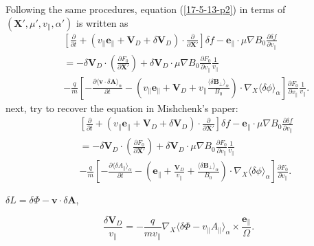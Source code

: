 \documentclass{article}
\begin{document}
Following the same procedures, equation (\ref{17-5-13-p2}) in terms of
$(\mathbf{X}', \mu', v_{\parallel}, \alpha')$ is written as
\begin{eqnarray}
  &  & \left[ \frac{\partial}{\partial t} + (v_{\parallel}
  \mathbf{e}_{\parallel} +\mathbf{V}_D + \delta \mathbf{V}_D) \cdot
  \frac{\partial}{\partial \mathbf{X}'} \right] \delta f
  -\mathbf{e}_{\parallel} \cdot \mu \nabla B_0 \frac{\partial \delta
  f}{\partial v_{\parallel}} \nonumber\\
  &  & = - \delta \mathbf{V}_D \cdot \left( \frac{\partial F_0}{\partial
  \mathbf{X}'} \right) + \delta \mathbf{V}_D \cdot \mu \nabla B_0
  \frac{\partial F_0}{\partial v_{\parallel}} \frac{1}{v_{\parallel}}
  \nonumber\\
  &  & - \frac{q}{m} \left[ - \frac{\partial \langle \mathbf{v} \cdot \delta
  \mathbf{A} \rangle_{\alpha}}{\partial t} - \left( v_{\parallel}
  \mathbf{e}_{\parallel} +\mathbf{V}_D + v_{\parallel} \frac{\langle \delta
  \mathbf{B}_{\perp} \rangle_{\alpha}}{B_0} \right) \cdot \nabla_X \langle
  \delta \phi \rangle_{\alpha} \right] \frac{\partial F_0}{\partial
  v_{\parallel}}  \frac{1}{v_{\parallel}} .  \label{17-5-13-p2m}
\end{eqnarray}
next, try to recover the equation in Mishchenk's paper:
\begin{eqnarray*}
  &  & \left[ \frac{\partial}{\partial t} + (v_{\parallel}
  \mathbf{e}_{\parallel} +\mathbf{V}_D + \delta \mathbf{V}_D) \cdot
  \frac{\partial}{\partial \mathbf{X}'} \right] \delta f
  -\mathbf{e}_{\parallel} \cdot \mu \nabla B_0 \frac{\partial \delta
  f}{\partial v_{\parallel}}\\
  &  & = - \delta \mathbf{V}_D \cdot \left( \frac{\partial F_0}{\partial
  \mathbf{X}'} \right) + \delta \mathbf{V}_D \cdot \mu \nabla B_0
  \frac{\partial F_0}{\partial v_{\parallel}} \frac{1}{v_{\parallel}}\\
  &  & - \frac{q}{m} \left[ - \frac{{\partial \langle \delta A_{\parallel}} 
  \rangle_{\alpha}}{\partial t} - \left( \mathbf{e}_{\parallel} +
  \frac{\mathbf{V}_D}{v_{\parallel}} + \frac{\langle \delta \mathbf{B}_{\perp}
  \rangle_{\alpha}}{B_0} \right) \cdot \nabla_X \langle \delta \phi
  \rangle_{\alpha} \right] \frac{\partial F_0}{\partial v_{\parallel}} .\\
  &  & \\
  &  & 
\end{eqnarray*}
$\delta L = \delta \Phi -\mathbf{v} \cdot \delta \mathbf{A}$,


\begin{equation}
  \frac{\delta \mathbf{V}_D}{v_{\parallel}} = - \frac{q}{m v_{\parallel}}
  \nabla_X \langle \delta \Phi - v_{\parallel} A_{\parallel} \rangle_{\alpha}
  \times \frac{\mathbf{e}_{\parallel}}{\Omega} .
\end{equation}
\end{document}
